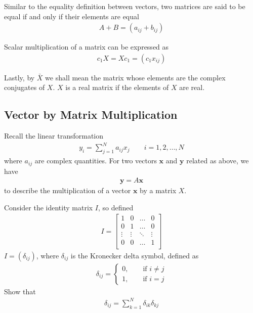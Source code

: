 Similar to the equality definition between vectors, two matrices are said to be equal if and only if their elements are equal \ie 
%
\begin{align}
	A + B = \left(a_{ij} + b_{ij}\right)
\end{align}

Scalar multiplication of a matrix can be expressed as 
%
\begin{align}
	c_1 X = X c_1 = \left(c_1 x_{ij}\right)
\end{align}

Lastly, by $\bar{X}$ we shall mean the matrix whose elements are the complex conjugates of $X$. $X$ is a real matrix if the elements of $X$ are real.

\subsection{Vector by Matrix Multiplication}

Recall the linear transformation
%
\begin{align}
	y_i = \sum_{j=1}^{N} a_{ij} x_j \qquad i=1,2,\ldots, N
\end{align}
%
where $a_{ij}$ are complex quantities. For two vectors $\bm{x}$ and $\bm{y}$ related as above, we have
%
\begin{align}
	\bm{y} = A \bm{x}
	\label{eq:linear_y}
\end{align}
%
to describe the multiplication of a vector $\bm{x}$ by a matrix $X$. 

\begin{homework}
	Consider the identity matrix $I$, so defined
	\begin{align}
		I = \begin{bmatrix}
		1 & 0 & \ldots & 0 \\
		0 & 1 & \ldots & 0 \\
		\vdots & \vdots & \ddots & \vdots \\
		0 & 0 & \ldots & 1 \\
		\end{bmatrix}
	\end{align}
	\ie $I = (\delta_{ij})$, where $\delta_{ij}$ is the Kronecker delta symbol, defined as
	\begin{align}
		\delta_{ij} = \begin{cases}
		0, \qquad \text{if  } i \neq j \\
		1, \qquad \text{if  }  i=j
		\end{cases}
	\end{align}
	Show that 
	\begin{align}
		\delta_{ij} = \sum_{k=1}^{N} \delta_{ik} \delta_{kj}
	\end{align}
\end{homework}

